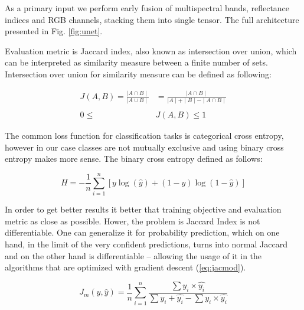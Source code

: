 \documentclass[10pt,twocolumn,letterpaper]{article}
\begin{document}
As a primary input we perform early fusion of multispectral bands, reflectance indices and RGB channels, stacking them into single tensor. The full architecture presented in Fig. \ref{fig:unet}.



Evaluation metric is Jaccard index, also known as intersection over union, which can be interpreted as similarity  measure between a finite number of sets. Intersection over union for similarity measure can be defined as following: 
 
\begin{equation}
\begin{aligned}
J(A,B) = \frac{\mid A \cap B \mid }{\mid A \cup B \mid} &= \frac{\mid A \cap B \mid}{\mid A \mid + \mid B \mid - \mid A \cap B \mid} \\ \\ 
0 \le & J(A,B) \le 1
\end{aligned}
\end{equation}

The common loss function for classification tasks is categorical cross entropy, however in our case classes are not mutually exclusive and using binary cross entropy makes more sense. The binary cross entropy defined as follows:

 
\begin{equation} \label{eq:bintropy}
H = -\frac{1}{n}\sum_{i=1}^n{[y \log(\hat{y})+(1-y)\log(1-\hat{y})]}
\end{equation}

In order to get better results it better that training objective and evaluation metric as close as possible. Hower, the problem is  Jaccard Index is not differentiable. One can generalize it for probability prediction, which on one hand, in the limit of the very confident predictions, turns into normal Jaccard and on the other hand is differentiable – allowing the usage of it in the algorithms that are optimized with gradient descent (\ref{eq:jacmod}). 

\begin{equation} \label{eq:jacmod}
J_{m}(y, \hat{y}) = \frac{1}{n} \sum_{i=1}^n \frac{\sum y_i \times \hat{y_i}}{\sum y_i + \hat{y_i} - \sum y_i \times \hat{y_i}}
\end{equation}
\end{document}
